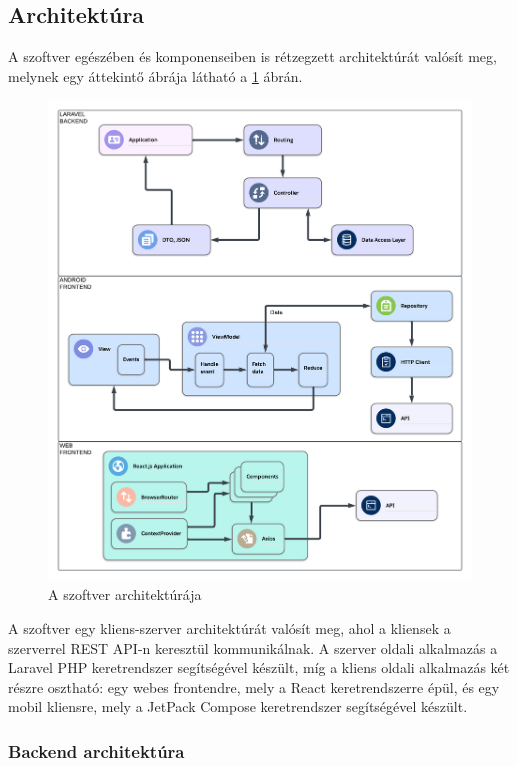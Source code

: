 \subsection{Architektúra}

A szoftver egészében és komponenseiben is rétzegzett architektúrát valósít meg, melynek egy áttekintő ábrája látható a \ref{fig:architecture} ábrán.

\begin{figure}[H]
    \centering
    \includegraphics[scale=0.5]{./figures/architecture.png}
    \caption{A szoftver architektúrája}
    \label{fig:architecture}
\end{figure}

A szoftver egy kliens-szerver architektúrát valósít meg, ahol a kliensek a szerverrel REST API-n keresztül kommunikálnak. A szerver oldali alkalmazás a Laravel PHP keretrendszer segítségével készült, míg a kliens oldali alkalmazás két részre osztható: egy webes frontendre, mely a React keretrendszerre épül, és egy mobil kliensre, mely a JetPack Compose keretrendszer segítségével készült.

\subsubsection{Backend architektúra}

